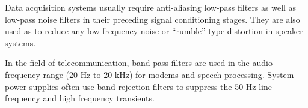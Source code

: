 Data acquisition systems usually require anti-aliasing low-pass filters as well as low-pass noise filters in their preceding signal conditioning stages. They are also used as to reduce any low frequency noise or “rumble” type distortion in speaker systems.

In the field of telecommunication, band-pass filters are used in the audio frequency range (20 Hz to 20 kHz) for modems and speech processing. System power supplies often use band-rejection filters to suppress the 50 Hz line frequency and high frequency transients.
